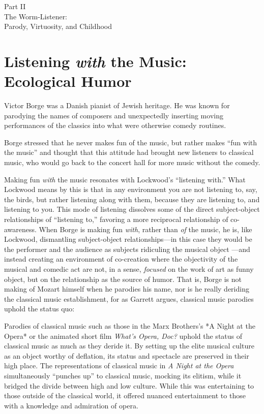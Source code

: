 \documentclass[12pt,letterpaper]{article}
\begin{document}
	\newpage
	\thispagestyle{empty}
	\vspace*{30pt}
	\begin{center}
	{\Huge Part II\\ 
	\Large The Worm-Listener:\\
	Parody, Virtuosity, and Childhood}
	\end{center}


	\newpage
	\section*{Listening \textit{with} the Music: Ecological Humor} 

	Victor Borge was a Danish pianist of Jewish heritage. He was known for 
	parodying the names of composers and unexpectedly inserting moving 
	performances of the classics into what were otherwise comedy 
	routines.\autocite[255]{Garrett}  

	Borge stressed that he never makes fun of the music, but rather makes 
	``fun with the music'' and thought that this attitude had brought new 
	listeners to classical music, who would go back to the concert hall for
	more music without the comedy.\autocite[256]{Garrett}

	Making fun \textit{with} the music resonates with Lockwood's 
	``listening with.'' What Lockwood means by this is that in any 
	environment you are not listening to, say, the birds, but rather 
	listening along with them, because they are listening to, and listening
	to you. This mode of listening dissolves some of the direct 
	subject-object relationships of ``listening to,'' favoring a more 
	reciprocal relationship of co-awareness.  When Borge is making fun 
	\textit{with}, rather than \textit{of} the music, he is, like Lockwood, 
	dismantling subject-object relationships---in this case they would be 
	the performer and the audience as subjects ridiculing the musical object
	---and instead creating an environment of co-creation where the 
	objectivity of the musical and comedic act are not, in a sense, 
	\textit{focused} on the work of art as funny object, but on the 
	relationship as the source of humor. That is, Borge is not making of 
	Mozart himself when he parodies his name, nor is he really deriding the
 	classical music establishment, for as Garrett argues, classical music 
	parodies uphold the status quo: 

	Parodies of classical music such as those in the Marx Brothers's *A 
	Night at the Opera* or the animated short film \textit{What's Opera, 
	Doc?} uphold the status of classical music as much as they deride it. By
	setting up the elite musical culture as an object worthy of deflation, 
	its status and spectacle are preserved in their high 
	place.\autocite[252]{Garrett} The representations of classical music in
	\textit{A Night at the Opera} simultaneously ``punches up'' to classical
	music, mocking its elitism, while it bridged the divide between high and
	low culture. While this was entertaining to those outside of the 
	classical world, it offered nuanced entertainment to those with a 
	knowledge and admiration of opera.\autocite[251]{Garrett} 
\end{document}
